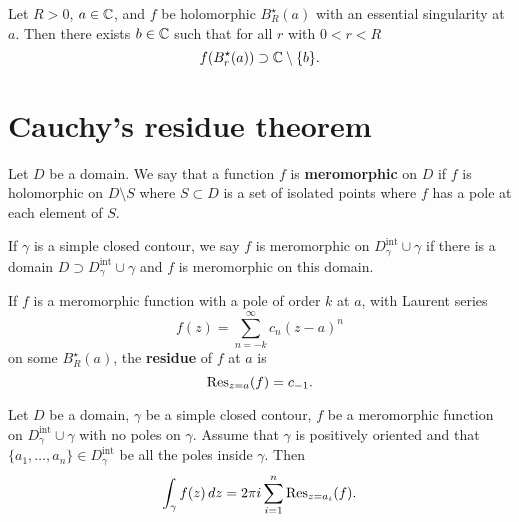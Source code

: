 \begin{theorem}
    Let $R > 0$, $a \in \mathbb{C}$, and $f$ be holomorphic $B_R^\star(a)$
    with an essential singularity at $a$.
    Then there exists $b \in \mathbb{C}$ such that for all $r$ with $0 < r < R$
    \[
        f(B_r^\star(a)) \supset \mathbb{C} \setminus \{b\}.
    \]
\end{theorem}

\chapter{Cauchy's residue theorem}

\begin{definition}[Meromorphic]
    Let $D$ be a domain.
    We say that a function $f$ is \textbf{meromorphic}
    on $D$ if $f$ is holomorphic on $D \setminus S$ where
    $S \subset D$ is a set of isolated points where 
    $f$ has a pole at each element of $S$.
\end{definition}

If $\gamma$ is a simple closed contour, we say $f$ is meromorphic on 
$D^{\operatorname{int}}_\gamma \cup \gamma$ 
if there is a domain 
$D \supset D^{\operatorname{int}}_\gamma \cup \gamma$
and $f$ is meromorphic on this domain.

\begin{definition}[]
    If $f$ is a meromorphic function with a pole of order $k$ at $a$, with Laurent series
    \[
        f(z) = \sum^{\infty}_{n=-k} c_n(z-a)^n
    \]
    on some $B_R^\star(a)$, the \textbf{residue} of $f$ at $a$ is
    \[
        \operatorname{Res}_{z=a} (f) = c_{-1}.
    \]
\end{definition}

\begin{theorem}
    Let $D$ be a domain, $\gamma$ be a simple closed contour, 
    $f$ be a meromorphic function on 
    $D_\gamma^{\operatorname{int}} \cup \gamma$
    with no poles on $\gamma$.
    Assume that $\gamma$ is positively oriented and that 
    $\{a_1, \ldots, a_n\} \in D_\gamma^{\operatorname{int}}$
    be all the poles inside $\gamma$.
    Then
    \[
        \int_\gamma f(z) \, dz = 2\pi i \sum^{n}_{i=1} \operatorname{Res}_{z=a_i}(f).
    \]
\end{theorem}
